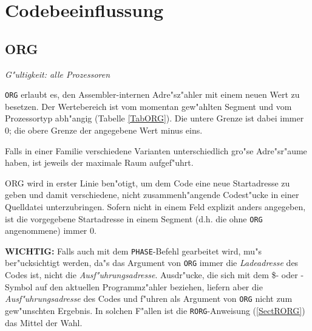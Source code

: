 \documentclass[12pt,a4paper,twoside]{report}
\makeatletter
\newcommand{\tty}[1]{{\tt #1}}
\newcommand{\ttindex}[1]{\index{#1@{\tt #1}}}
\makeatother
\begin{document}

\section{Codebeeinflussung}


\subsection{ORG}
\label{SectORG}\ttindex{ORG}

{\em G"ultigkeit: alle Prozessoren}

\tty{ORG} erlaubt es, den Assembler-internen Adre"sz"ahler mit einem neuen
Wert zu besetzen.  Der Wertebereich ist vom momentan gew"ahlten Segment
und vom Prozessortyp abh"angig (Tabelle \ref{TabORG}).
Die untere Grenze ist dabei immer 0; die obere Grenze der angegebene Wert
minus eins.
\par
Falls in einer Familie verschiedene Varianten unterschiedlich
gro"se Adre"sr"aume haben, ist jeweils der maximale Raum aufgef"uhrt.
\par
ORG wird in erster Linie ben"otigt, um dem Code eine neue Startadresse
zu geben und damit verschiedene, nicht zusammenh"angende Codest"ucke in
einer Quelldatei unterzubringen.  Sofern nicht in einem Feld explizit anders
angegeben, ist die vorgegebene Startadresse in einem Segment (d.h. die ohne
{\tt ORG} angenommene) immer 0.
\par
{\bf WICHTIG:} Falls auch mit dem \tty{PHASE}-Befehl gearbeitet
wird, mu"s ber"ucksichtigt werden, da"s das Argument von \tty{ORG}
immer die {\em Ladeadresse} des Codes ist, nicht die {\em
Ausf"uhrungsadresse}.  Ausdr"ucke, die sich mit dem \$- oder
\*-Symbol auf den aktuellen Programmz"ahler beziehen, liefern
aber die {\em Ausf"uhrungsadresse} des Codes und f"uhren als
Argument von \tty{ORG} nicht zum gew"unschten Ergebnis.  In
solchen F"allen ist die \tty{RORG}-Anweisung (\ref{SectRORG}) das
Mittel der Wahl.
\end{document}
